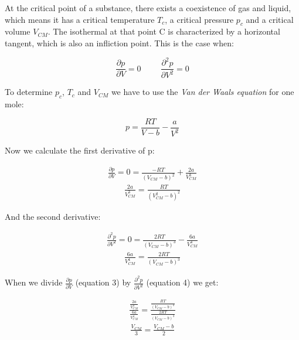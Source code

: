 \documentclass{scrartcl}
\begin{document}
At the critical point of a substance, there exists a coexistence of gas and liquid, which means it has a critical temperature $T_c$, a critical pressure $p_c$ and a critical volume $V_{CM}$. The isothermal at that point C is characterized by a horizontal tangent, which is also an infliction point.
This is the case when:

\begin{equation}
    \frac{\partial p}{\partial V} = 0 \hspace{1cm} \frac{\partial^2 p}{\partial V^2}=0
\end{equation}

To determine $p_c$, $T_c$ and $V_{CM}$ we have to use the \textit{Van der Waals equation} for one mole:

\begin{equation}
    p=\frac{RT}{V-b}-\frac{a}{V^2}
\end{equation}

Now we calculate the first derivative of p:

\begin{align}
\frac{\partial p}{\partial V} = 0 =\frac{-RT}{(V_{CM}-b)^2}+\frac{2a}{V_{CM}^3}\nonumber
\end{align}
\begin{equation} 
\begin{split}
\frac{2a}{V_{CM}^3}=\frac{RT}{(V_{CM}^2-b)^2}
\end{split}
\end{equation}

 And the second derivative:
 
\begin{align}
\frac{\partial^2 p}{\partial V^2}=0=\frac{2RT}{(V_{CM}-b)^3}-\frac{6a}{V_{CM}^4}\nonumber
\end{align}
\begin{equation} 
\begin{split}
 \frac{6a}{V_{CM}^4}=\frac{2RT}{(V_{CM}-b)^3}
\end{split}
\end{equation}

When we divide $\frac{\partial p}{\partial V}$ (equation 3) by $\frac{\partial^2 p}{\partial V^2}$ (equation 4) we get:

\begin{align}
\frac{\frac{2a}{V_{CM}^3}}{\frac{6a}{V_{CM}^4}} = \frac{\frac{RT}{(V_{CM}-b)^2}}{\frac{2RT}{(V_{CM}-b)^3}}\nonumber
\end{align}
\begin{equation} 
\begin{split}
\frac{V_{CM}}{3}=\frac{V_{CM}-b}{2}
\end{split}
\end{equation}
\end{document}

